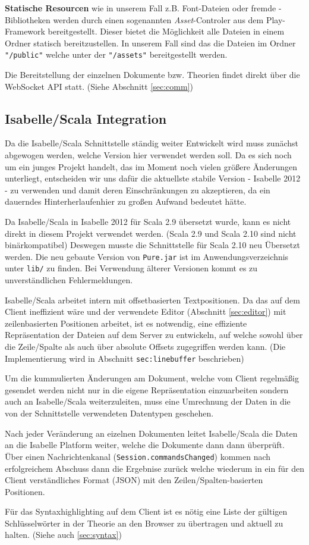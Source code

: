 \textbf{Statische Resourcen} wie in unserem Fall z.B. Font-Dateien oder fremde -Bibliotheken
werden durch einen sogenannten \textit{Asset}-Controler aus dem Play-Framework bereitgestellt.
Dieser bietet die Möglichkeit alle Dateien in einem Ordner statisch bereitzustellen. In unserem Fall
sind das die Dateien im Ordner \texttt{"/public"} welche unter der  \texttt{"/assets"}
bereitgestellt werden.

Die Bereitstellung der einzelnen Dokumente bzw. Theorien findet direkt über die WebSocket API statt.
(Siehe Abschnitt \ref{sec:comm})

\subsection{Isabelle/Scala Integration}

Da die Isabelle/Scala Schnittstelle ständig weiter Entwickelt wird muss zunächst abgewogen werden,
welche Version hier verwendet werden soll. Da es sich noch um ein junges Projekt handelt, das im
Moment noch vielen größere Änderungen unterliegt, entscheiden wir uns dafür die aktuellste stabile
Version - Isabelle 2012 - zu verwenden und damit deren Einschränkungen zu akzeptieren, da ein
dauerndes \glqq Hinterherlaufen\grqq hier zu großen Aufwand bedeutet hätte.

Da Isabelle/Scala in Isabelle 2012 für Scala 2.9 übersetzt wurde, kann es nicht direkt in diesem
Projekt verwendet werden. (Scala 2.9 und Scala 2.10 sind nicht binärkompatibel) Deswegen musste die
Schnittstelle für Scala 2.10 neu Übersetzt werden. Die neu gebaute Version von \texttt{Pure.jar} ist
im Anwendungsverzeichnis unter \texttt{lib/} zu finden. Bei Verwendung älterer Versionen kommt es zu
unverständlichen Fehlermeldungen.

Isabelle/Scala arbeitet intern mit offsetbasierten Textpositionen. Da das auf dem Client ineffizient
wäre und der verwendete Editor (Abschnitt \ref{sec:editor}) mit zeilenbasierten Positionen arbeitet,
ist es notwendig, eine effiziente Repräsentation der Dateien auf dem Server zu entwickeln, auf
welche sowohl über die Zeile/Spalte als auch über absolute Offsets zugegriffen werden kann. (Die
Implementierung wird in Abschnitt \texttt{sec:linebuffer} beschrieben) 

Um die kummulierten Änderungen am Dokument, welche vom Client regelmäßig gesendet werden nicht nur
in die eigene Repräsentation einzuarbeiten sondern auch an Isabelle/Scala weiterzuleiten, muss eine
Umrechnung der Daten in die von der Schnittstelle verwendeten Datentypen geschehen.

Nach jeder Veränderung an eizelnen Dokumenten leitet Isabelle/Scala die Daten an die Isabelle
Platform weiter, welche die Dokumente dann dann überprüft. Über einen Nachrichtenkanal
(\texttt{Session.commandsChanged}) kommen nach erfolgreichem Abschuss dann die Ergebnise zurück
welche wiederum in ein für den Client verständliches Format (JSON) mit den Zeilen/Spalten-basierten
Positionen.

Für das Syntaxhighlighting auf dem Client ist es nötig eine Liste der gültigen Schlüsselwörter in
der Theorie an den Browser zu übertragen und aktuell zu halten. (Siehe auch \ref{sec:syntax})
